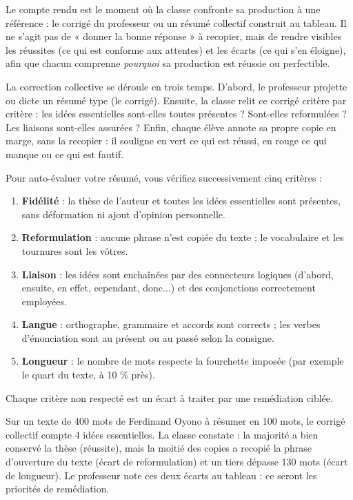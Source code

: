 \documentclass[11pt]{article}
\newcommand{\cle}[1]{{\popxbold\color{popdark}#1}}
\newcounter{popsec}
\newcounter{popsub}
\newcommand{\courssub}[1]{%
  \stepcounter{popsub}%
  \par\vspace{9pt}\noindent{\popxbold\fontsize{11.5}{13}\selectfont\color{popink}{\color{poporange}\thepopsec.\thepopsub}\hspace{6pt}#1}\par\nopagebreak\vspace{4pt}
}
\begin{document}
\courssub{Correction collective d'un résumé type}

\begin{definition}
Le \cle{compte rendu} est le moment où la classe confronte sa production à une référence : le corrigé du professeur ou un résumé collectif construit au tableau. Il ne s'agit pas de « donner la bonne réponse » à recopier, mais de rendre visibles les \cle{réussites} (ce qui est conforme aux attentes) et les \cle{écarts} (ce qui s'en éloigne), afin que chacun comprenne \emph{pourquoi} sa production est réussie ou perfectible.
\end{definition}

La correction collective se déroule en trois temps. D'abord, le professeur projette ou dicte un \cle{résumé type} (le corrigé). Ensuite, la classe relit ce corrigé critère par critère : les idées essentielles sont-elles toutes présentes ? Sont-elles reformulées ? Les liaisons sont-elles assurées ? Enfin, chaque élève annote sa propre copie en marge, sans la recopier : il souligne en vert ce qui est réussi, en rouge ce qui manque ou ce qui est fautif.

\begin{methode}
Pour auto-évaluer votre résumé, vous vérifiez successivement cinq critères :
\begin{enumerate}
\item \textbf{Fidélité} : la thèse de l'auteur et toutes les idées essentielles sont présentes, sans déformation ni ajout d'opinion personnelle.
\item \textbf{Reformulation} : aucune phrase n'est copiée du texte ; le vocabulaire et les tournures sont les vôtres.
\item \textbf{Liaison} : les idées sont enchaînées par des connecteurs logiques (d'abord, ensuite, en effet, cependant, donc...) et des conjonctions correctement employées.
\item \textbf{Langue} : orthographe, grammaire et accords sont corrects ; les verbes d'énonciation sont au présent ou au passé selon la consigne.
\item \textbf{Longueur} : le nombre de mots respecte la fourchette imposée (par exemple le quart du texte, à 10 \% près).
\end{enumerate}
Chaque critère non respecté est un écart à traiter par une remédiation ciblée.
\end{methode}

\begin{exemplebox}
Sur un texte de 400 mots de Ferdinand Oyono à résumer en 100 mots, le corrigé collectif compte 4 idées essentielles. La classe constate : la majorité a bien conservé la thèse (réussite), mais la moitié des copies a recopié la phrase d'ouverture du texte (écart de reformulation) et un tiers dépasse 130 mots (écart de longueur). Le professeur note ces deux écarts au tableau : ce seront les priorités de remédiation.
\end{exemplebox}
\end{document}
